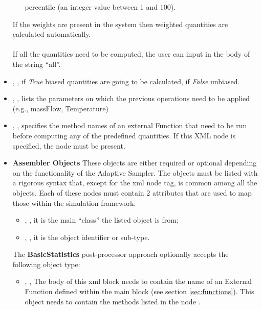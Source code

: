 \begin{itemize}
\begin{itemize}
                               percentile (an integer value between 1 and 100).
  \end{itemize}
  \nb If the weights are present in the system then weighted quantities are calculated automatically.
  \\
  \\  If all the quantities need to be computed, the user can input in the body of
   the string ``all''.
  \item {}, , if \textit{True} biased
  quantities are going to be calculated, if \textit{False} unbiased.
  \item {}, ,
  lists the parameters on which the previous operations need to be applied
  (e.g., massFlow, Temperature)
  \item {}, , specifies the method names of an external Function that need to be run
  before computing any of the predefined quantities.
  If this XML node is specified, the  node must be present.
  \item \textbf{Assembler Objects} These objects are either required or optional
  depending on the functionality of the Adaptive Sampler.
  The objects must be listed with a rigorous syntax that, except for the xml
  node tag, is common among all the objects.
  Each of these nodes must contain 2 attributes that are used to map those
  within the simulation framework:
  \begin{itemize}
    \item {}, , it is the main
    ``class'' the listed object is from;
    \item {}, , it is the object
    identifier or sub-type.
  \end{itemize}
  The \textbf{BasicStatistics} post-processor approach optionally accepts the
  following object type:
  \begin{itemize}
    \item {}, , The body of
    this xml block needs to contain the name of an External Function defined
    within the  main block (see section \ref{sec:functions}).
    This object needs to contain the methods listed in the node
    .
  \end{itemize}
\end{itemize}
